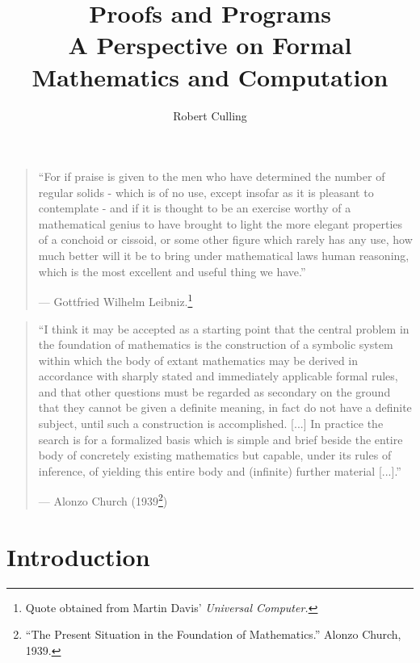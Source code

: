 \documentclass{book}
\title{Proofs and Programs \\
        \normalsize{A Perspective on Formal Mathematics and Computation}}
\author{Robert Culling}
\begin{document}
\maketitle

\vspace*{3cm}

\begin{quote}

    ``For if praise is given to the men who have determined the number of regular solids - which is of no use, except insofar as it is pleasant to contemplate - and if it is thought to be an exercise worthy of a mathematical genius to have brought to light the more elegant properties of a conchoid or cissoid, or some other figure which rarely has any use, how much better will it be to bring under mathematical laws human reasoning, which is the most excellent and useful thing we have.''
    \begin{flushright}
        --- Gottfried Wilhelm Leibniz.\footnote{Quote obtained from Martin Davis' \emph{Universal Computer.}}
    \end{flushright}

\end{quote}


\begin{quote}
    ``I think it may be accepted as a starting point that the central problem in the foundation of mathematics is the construction of a symbolic system within which the body of extant mathematics may be derived in accordance with sharply stated and immediately applicable formal rules, and that other questions must be regarded as secondary on the ground that they cannot be given a definite meaning, in fact do not have a definite subject, until such a construction is accomplished. [...] In practice the search is for a formalized basis which is simple and brief beside the entire body of concretely existing mathematics but capable, under its rules of inference, of yielding this entire body and (infinite) further material [...].''
    \begin{flushright}
        --- Alonzo Church (1939\footnote{``The Present Situation in the Foundation of Mathematics.'' Alonzo Church, 1939.})
    \end{flushright}
\end{quote}

\tableofcontents

\chapter{Introduction}
\end{document}
